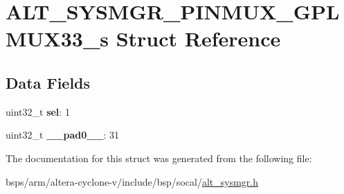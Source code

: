 \hypertarget{structALT__SYSMGR__PINMUX__GPLMUX33__s}{}\section{A\+L\+T\+\_\+\+S\+Y\+S\+M\+G\+R\+\_\+\+P\+I\+N\+M\+U\+X\+\_\+\+G\+P\+L\+M\+U\+X33\+\_\+s Struct Reference}
\label{structALT__SYSMGR__PINMUX__GPLMUX33__s}
\subsection*{Data Fields}
\begin{DoxyCompactItemize}
\item 
\mbox{\label{structALT__SYSMGR__PINMUX__GPLMUX33__s_a880d15484ac4540bd45c1322b8358ac4}} 
uint32\+\_\+t {\bfseries sel}\+: 1
\item 
\mbox{\label{structALT__SYSMGR__PINMUX__GPLMUX33__s_afa38fa320b3332e1f542be76e27fab79}} 
uint32\+\_\+t {\bfseries \+\_\+\+\_\+pad0\+\_\+\+\_\+}\+: 31
\end{DoxyCompactItemize}


The documentation for this struct was generated from the following file\+:\begin{DoxyCompactItemize}
\item 
bsps/arm/altera-\/cyclone-\/v/include/bsp/socal/\mbox{\hyperlink{alt__sysmgr_8h}{alt\+\_\+sysmgr.\+h}}\end{DoxyCompactItemize}
